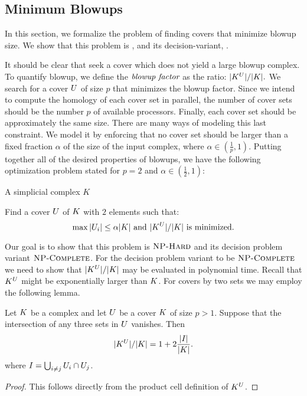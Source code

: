 \subsection{Minimum Blowups}
\label{sec:hardness}
In this section, we formalize the problem of finding covers
that minimize blowup size. We show that this problem is \NPH{}, and its 
decision-variant, \NPC{}.

It should be clear that seek a cover which does not yield a large blowup complex. 
To quantify blowup, we define the $\emph{blowup factor}$ as the ratio: 
$|K^{U}|/|K|.$ We search for a cover $U$ of size $p$ that minimizes the blowup 
factor. Since we intend to compute the homology of each cover set in parallel,
the number of cover sets should be the number $p$ of available 
processors. Finally, each cover set should be approximately the same 
size. There are many ways of modeling this last constraint. 
We model it by enforcing that no cover set should be larger than a fixed fraction
$\alpha$ of the size of the input complex, where $\alpha \in (\frac{1}{p},1)$. 
Putting together all of the desired properties of blowups, we have the following 
optimization problem stated for $p = 2$ and $\alpha \in (\frac{1}{2}, 1)$:
\begin{description}
\addtolength{\itemsep}{-.7\baselineskip}
\item[\textsc{Problem:}]  \ablp 
\item[\textsc{Instance:}] A simplicial complex $K$
\item[\textsc{Goal:}] Find a cover $U$ of $K$ with $2$ elements such that: 
\[ \max{|U_i|} \leq \alpha|K| \textrm{ and } |K^{U}|/|K| \textrm{ is minimized.} \]
\end{description}
Our goal is to show that this problem is $\textsc{NP-Hard}{}$ and its decision problem variant $\textsc{NP-Complete}{}$.
For the decision problem variant to be $\textsc{NP-Complete}{}$ we need to show that $|K^{U}|/|K|$ may
be evaluated in polynomial time. Recall that $K^{U}$ might be exponentially larger than $K$. 
For covers by two sets we may employ the following lemma.
\begin{lemma}
\label{lem:char-blowup-sol}
Let $K$ be a complex and let $U$ be a cover $K$ 
of size $p > 1$. Suppose that the intersection
of any three sets in $U$ vanishes. Then
\begin{equation*}
|K^{U}|/|K| = 1 + 2\frac{|I|}{|K|}. 
\end{equation*}
where $I = \bigcup_{i \neq j}{U_i \cap U_j}$.
\end{lemma}
\begin{proof}
This follows directly from the product cell definition of $K^U$.
\end{proof}
